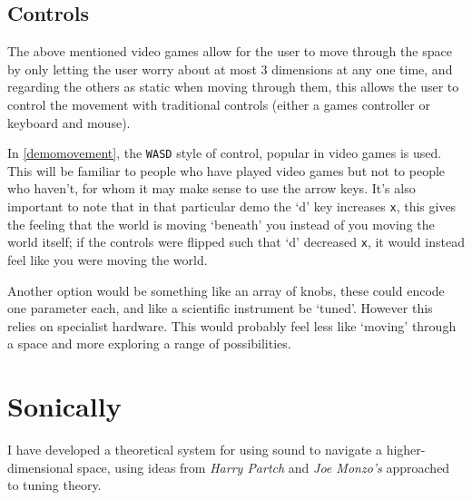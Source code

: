 \subsection{Controls}
The above mentioned video games allow for the user to move through the space by
only letting the user worry about at most 3 dimensions at any one time, and
regarding the others as static when moving through them, this allows the user to
control the movement with traditional controls (either a games controller or
keyboard and mouse).

In \autoref{demomovement}, the \verb|WASD| style of control, popular in video
games is used. This will be familiar to people who have played video games but
not to people who haven't, for whom it may make sense to use the arrow keys.
It's also important to note that in that particular demo the `d' key increases
\verb|x|, this gives the feeling that the world is moving `beneath' you instead
of you moving the world itself; if the controls were flipped such that `d'
decreased \verb|x|, it would instead feel like you were moving the world. 

Another option would be something like an array of knobs, these could encode one
parameter each, and like a scientific instrument be `tuned'. However this relies
on specialist hardware. This would probably feel less like `moving' through a
space and more exploring a range of possibilities.

\section{Sonically}
\label{sonicnav}
I have developed a theoretical system for using sound to navigate a
higher-dimensional space, using ideas from \emph{Harry Partch} and \emph{Joe
Monzo's} approached to tuning theory.

